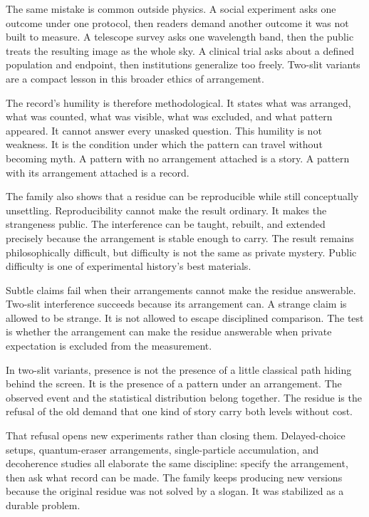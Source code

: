 The same mistake is common outside physics. A social experiment asks one
outcome under one protocol, then readers demand another outcome it was not
built to measure. A telescope survey asks one wavelength band, then the
public treats the resulting image as the whole sky. A clinical trial asks
about a defined population and endpoint, then institutions generalize too
freely. Two-slit variants are a compact lesson in this broader ethics of
arrangement.

The record's humility is therefore methodological. It states what was
arranged, what was counted, what was visible, what was excluded, and what
pattern appeared. It cannot answer every unasked question. This humility is
not weakness. It is the condition under which the pattern can travel without
becoming myth. A pattern with no arrangement attached is a story. A pattern
with its arrangement attached is a record.

The family also shows that a residue can be reproducible while still
conceptually unsettling. Reproducibility cannot make the result ordinary. It
makes the strangeness public. The interference can be taught, rebuilt, and
extended precisely because the arrangement is stable enough to carry. The
result remains philosophically difficult, but difficulty is not the same as
private mystery. Public difficulty is one of experimental history's best
materials.

Subtle claims fail when their arrangements cannot make the residue
answerable. Two-slit interference succeeds because its arrangement can. A
strange claim is allowed to be strange. It is not allowed to escape
disciplined comparison. The test is whether the arrangement can make the
residue answerable when private expectation is excluded from the measurement.

In two-slit variants, presence is not the presence of a little classical path
hiding behind the screen. It is the presence of a pattern under an
arrangement. The observed event and the statistical distribution belong
together. The residue is the refusal of the old demand that one kind of
story carry both levels without cost.

That refusal opens new experiments rather than closing them. Delayed-choice
setups, quantum-eraser arrangements, single-particle accumulation, and
decoherence studies all elaborate the same discipline: specify the
arrangement, then ask what record can be made. The family keeps producing new
versions because the original residue was not solved by a slogan. It was
stabilized as a durable problem.

